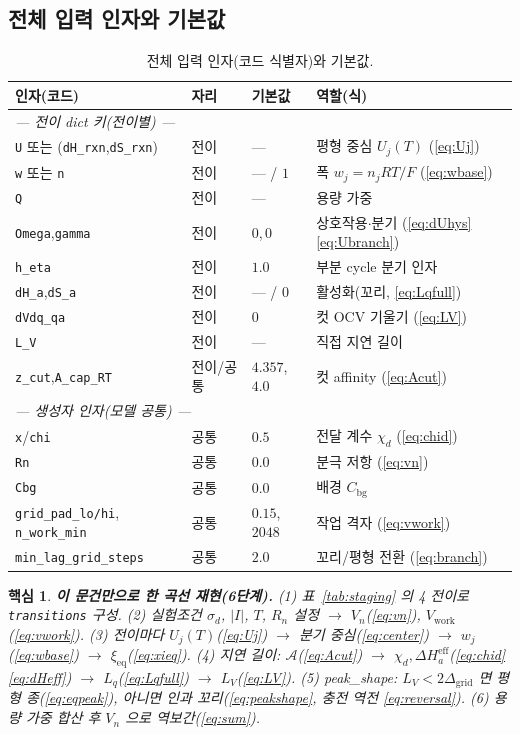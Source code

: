 \documentclass[11pt,a4paper]{article}
\newtheorem*{keybox}{핵심}
\newcommand{\eff}{\mathrm{eff}}
\newcommand{\eq}{\mathrm{eq}}
\newcommand{\bg}{\mathrm{bg}}
\newcommand{\work}{\mathrm{work}}
\newcommand{\code}[1]{\texttt{#1}}
\begin{document}
\subsection{전체 입력 인자와 기본값}
\begin{table}[t]
\centering\footnotesize
\renewcommand{\arraystretch}{1.18}
\caption{전체 입력 인자(코드 식별자)와 기본값.}
\label{tab:inputs}
\begin{tabular}{l l l l}
\toprule
인자(코드) & 자리 & 기본값 & 역할(식) \\
\midrule
\multicolumn{4}{l}{\emph{— 전이 dict 키(전이별) —}}\\
\code{U} 또는 (\code{dH\_rxn},\code{dS\_rxn}) & 전이 & --- & 평형 중심 $U_j(T)$ (\eqref{eq:Uj}) \\
\code{w} 또는 \code{n} & 전이 & --- / $1$ & 폭 $w_j=n_jRT/F$ (\eqref{eq:wbase}) \\
\code{Q} & 전이 & --- & 용량 가중 \\
\code{Omega},\code{gamma} & 전이 & $0$,\,$0$ & 상호작용$\cdot$분기 (\eqref{eq:dUhys}\eqref{eq:Ubranch}) \\
\code{h\_eta} & 전이 & $1.0$ & 부분 cycle 분기 인자 \\
\code{dH\_a},\code{dS\_a} & 전이 & --- / $0$ & 활성화(꼬리, \eqref{eq:Lqfull}) \\
\code{dVdq\_qa} & 전이 & $0$ & 컷 OCV 기울기 (\eqref{eq:LV}) \\
\code{L\_V} & 전이 & --- & 직접 지연 길이 \\
\code{z\_cut},\code{A\_cap\_RT} & 전이/공통 & $4.357$,\,$4.0$ & 컷 affinity (\eqref{eq:Acut}) \\
\multicolumn{4}{l}{\emph{— 생성자 인자(모델 공통) —}}\\
\code{x}/\code{chi} & 공통 & $0.5$ & 전달 계수 $\chi_d$ (\eqref{eq:chid}) \\
\code{Rn} & 공통 & $0.0$ & 분극 저항 (\eqref{eq:vn}) \\
\code{Cbg} & 공통 & $0.0$ & 배경 $C_\bg$ \\
\code{grid\_pad\_lo/hi},\,\code{n\_work\_min} & 공통 & $0.15$,\,$2048$ & 작업 격자 (\eqref{eq:vwork}) \\
\code{min\_lag\_grid\_steps} & 공통 & $2.0$ & 꼬리/평형 전환 (\eqref{eq:branch}) \\
\bottomrule
\end{tabular}
\end{table}

\begin{keybox}
\textbf{이 문건만으로 한 곡선 재현(6단계).}
(1) 표~\ref{tab:staging} 의 4 전이로 \code{transitions} 구성.
(2) 실험조건 $\sigma_d$, $|I|$, $T$, $R_n$ 설정 $\to$ $V_n$(\eqref{eq:vn}), $V_\work$(\eqref{eq:vwork}).
(3) 전이마다 $U_j(T)$(\eqref{eq:Uj}) $\to$ 분기 중심(\eqref{eq:center}) $\to$ $w_j$(\eqref{eq:wbase}) $\to$ $\xi_\eq$(\eqref{eq:xieq}).
(4) 지연 길이: $\mathcal A$(\eqref{eq:Acut}) $\to$ $\chi_d,\Delta H_a^\eff$(\eqref{eq:chid}\eqref{eq:dHeff}) $\to$ $L_q$(\eqref{eq:Lqfull}) $\to$ $L_V$(\eqref{eq:LV}).
(5) peak\_shape: $L_V<2\Delta_\mathrm{grid}$ 면 평형 종(\eqref{eq:eqpeak}), 아니면 인과 꼬리(\eqref{eq:peakshape}, 충전 역전 \eqref{eq:reversal}).
(6) 용량 가중 합산 후 $V_n$ 으로 역보간(\eqref{eq:sum}).
\end{keybox}
\end{document}
